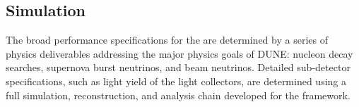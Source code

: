 %
\subsection{Simulation}
\label{sec:fdsp-pd-simphys}




The broad performance specifications for the  are determined by a series of physics deliverables addressing the major physics goals of DUNE: nucleon decay searches, supernova burst neutrinos, and beam neutrinos. Detailed sub-detector specifications, such as light yield of the light collectors, are determined using a full simulation, reconstruction, and analysis chain developed for the \larsoft framework. 


